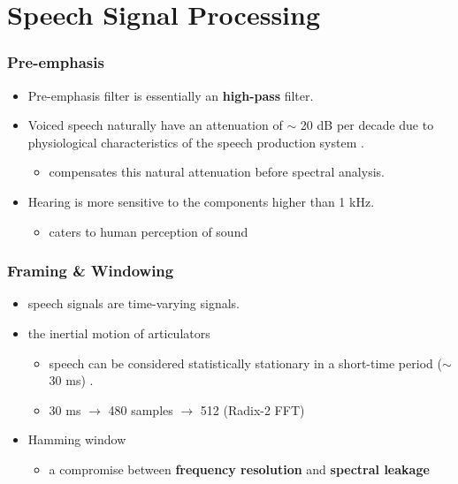 \section{Speech Signal Processing}

\begin{frame}
\frametitle{Pre-emphasis}
\begin{itemize}
\item Pre-emphasis filter is essentially an \textbf{high-pass} filter.
\vspace{15pt}
\item Voiced speech naturally have an attenuation of $\sim$ 20 dB per decade due to physiological characteristics of the speech production system \cite{picone1993signal}.
\begin{itemize}
\item compensates this natural attenuation before spectral analysis.
\end{itemize}
\vspace{15pt}
\item Hearing is more sensitive to the components higher than 1 kHz.
\begin{itemize}
\item caters to human perception of sound
\end{itemize}
\end{itemize}
\end{frame}


\begin{frame}
\frametitle{Framing \& Windowing}
\begin{itemize}
	\item speech signals are time-varying signals.
	\item the inertial motion of articulators
	\begin{itemize}
		\item speech can be considered statistically stationary in a short-time period ($\sim$ 30 ms) \cite{brandstein1995practical}.
		\item 30 ms $\longrightarrow$ 480 samples $\longrightarrow$ 512 (Radix-2 FFT)
	\end{itemize}
	\item Hamming window
	\begin{itemize}
		\item a compromise between \textbf{frequency resolution} and \textbf{spectral leakage}
	\end{itemize}
\end{itemize}
\end{frame}

